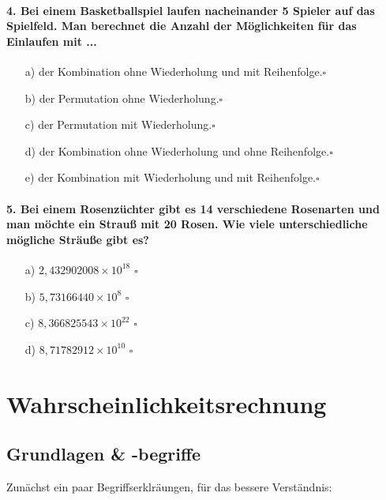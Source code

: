 \documentclass[a4paper]{article}
\begin{document}
\paragraph{4. Bei einem Basketballspiel laufen nacheinander 5 Spieler auf das Spielfeld. Man berechnet die Anzahl der Möglichkeiten für das Einlaufen mit ...}
\begin{itemize}
    \item[a)] der Kombination ohne Wiederholung und mit Reihenfolge.\hfill $\square$
    \item[b)] der Permutation ohne Wiederholung.\hfill $\square$
    \item[c)] der Permutation mit Wiederholung.\hfill $\square$
    \item[d)] der Kombination ohne Wiederholung und ohne Reihenfolge.\hfill $\square$
    \item[e)] der Kombination mit Wiederholung und mit Reihenfolge.\hfill $\square$
\end{itemize}

\paragraph{5. Bei einem Rosenzüchter gibt es 14 verschiedene Rosenarten und man möchte ein Strauß mit 20 Rosen. Wie viele unterschiedliche mögliche Sträuße gibt es?}
\begin{itemize}
    \item[a)] $2,432902008 \times 10^{18}$ \hfill $\square$
    \item[b)] $5,73166440 \times 10^8$ \hfill $\square$
    \item[c)] $8,366825543 \times 10^{22}$ \hfill $\square$
    \item[d)] $8,71782912 \times 10^{10}$ \hfill $\square$
\end{itemize}


\clearpage


\section{Wahrscheinlichkeitsrechnung}\label{chap:wkeit}
\subsection{Grundlagen \& -begriffe}\label{sec:wkeit-basics}
Zunächst ein paar Begriffserklräungen, für das bessere Verständnis:
\end{document}
